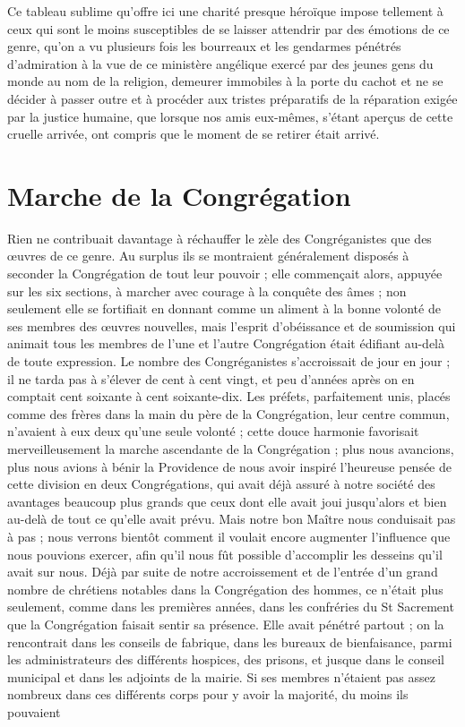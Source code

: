 Ce tableau sublime qu'offre ici une charité presque héroïque impose tellement à ceux qui sont le moins susceptibles de se laisser attendrir par des émotions de ce genre, qu'on a vu plusieurs fois les bourreaux et les gendarmes pénétrés d'admiration à la vue de ce ministère angélique exercé par des jeunes gens du monde au nom de la religion, demeurer immobiles à la porte du cachot et ne se décider à passer outre et à procéder aux tristes préparatifs de la réparation exigée par la justice humaine, que lorsque nos amis eux-mêmes, s'étant aperçus de cette cruelle arrivée, ont compris que le moment de se retirer était arrivé.

\section*{Marche de la Congrégation}
Rien ne contribuait davantage à réchauffer le zèle des Congréganistes que des œuvres de ce genre. Au surplus ils se montraient généralement disposés à seconder la Congrégation de tout leur pouvoir ; elle commençait alors, appuyée sur les six sections, à marcher avec courage à la conquête des âmes ; non seulement elle se fortifiait en donnant comme un aliment à la bonne volonté de ses membres des œuvres nouvelles, mais l'esprit d'obéissance et de soumission qui animait tous les membres de l'une et l'autre Congrégation
était édifiant au-delà de toute expression. Le nombre des Congréganistes s'accroissait de jour en jour ; il ne tarda pas à s'élever de cent à cent vingt, et peu d'années après on en comptait cent soixante à cent soixante-dix. Les préfets, parfaitement unis, placés comme des frères dans la main du père de la Congrégation, leur centre commun, n'avaient à eux deux qu'une seule volonté ; cette douce harmonie favorisait merveilleusement la marche ascendante de la Congrégation ; plus nous avancions, plus nous avions à bénir la Providence de nous avoir inspiré l'heureuse pensée de cette division en deux Congrégations, qui avait déjà assuré à notre société des avantages beaucoup plus grands que ceux dont elle avait joui jusqu'alors et bien au-delà de tout ce qu'elle avait prévu. Mais notre bon Maître nous conduisait pas à pas ; nous verrons bientôt comment il voulait encore augmenter l'influence que nous pouvions exercer, afin qu'il nous fût possible d'accomplir les desseins qu'il avait sur nous. Déjà par suite de notre accroissement et de l'entrée d'un grand nombre de chrétiens notables dans la Congrégation des hommes, ce n'était plus seulement, comme dans les premières années, dans les confréries du St Sacrement que la Congrégation faisait sentir sa présence. Elle avait pénétré partout ; on la rencontrait dans les conseils de fabrique, dans les bureaux de bienfaisance, parmi les administrateurs des différents hospices, des prisons, et jusque dans le conseil municipal et dans les adjoints de la mairie. Si ses membres n'étaient pas assez nombreux dans ces différents corps pour y avoir la majorité, du moins ils pouvaient
